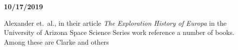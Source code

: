 
{\bf 10/17/2019}

Alexander et.\ al., in their article {\it The Exploration History of
  Europa}\cite{Alexander2009} in the University of Arizona Space Science Series
work \cite{Pappalardo2009} reference a number of books.
Among these are Clarke and others

